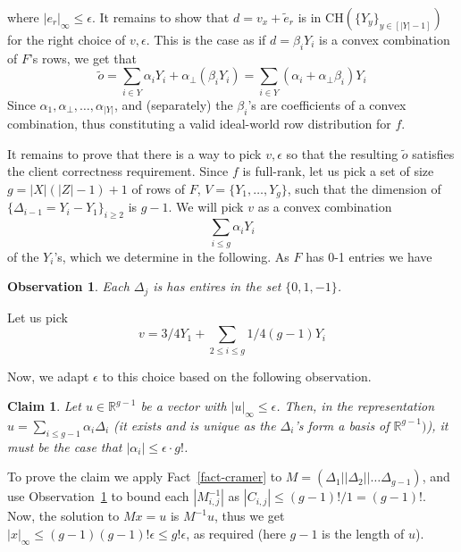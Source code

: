 \documentclass[a4paper]{article}
\newtheorem{claim}[theorem]{Claim}
\newtheorem{observation}{Observation}
\newcommand{\R}{\mathbb{R}}
\newcommand{\CH}[1]{\text{CH}(#1)}
\begin{document}
where $|e_r|_\infty\leq \epsilon$.
It remains to show that $d = v_x + \tilde{e}_r$ is in $\CH{\{Y_y\}_{y\in [|Y|-1]}}$ for the right choice of $v,\epsilon$. This is the case as if $d = \beta_i Y_i$ is a convex combination of $F$'s rows, we get that
\[\tilde{o} = \sum_{i\in Y}\alpha_i Y_i + \alpha_\bot (\beta_i Y_i)=\sum_{i\in Y}(\alpha_i +\alpha_\bot\beta_i)Y_i\]
Since $\alpha_1,\alpha_\bot,\ldots,\alpha_{|Y|}$, and (separately) the $\beta_i$'s are coefficients of a convex combination, thus constituting a valid ideal-world row distribution for $f$.


It remains to prove that there is a way to pick $v,\epsilon$ 
so that the resulting $\tilde{o}$ satisfies the client correctness requirement.
Since $f$ is full-rank, let us pick  a set of size $g=|X|(|Z|-1)+1$ of rows of $F$, $V = \{Y_1,\ldots,Y_g\}$, such that the dimension of $\{\Delta_{i-1} = Y_i - Y_1\}_{i\geq 2}$ is $g-1$. We will pick $v$ as a convex combination
\[\sum_{i\leq g}\alpha_iY_i\]
of the $Y_i$'s, which we determine in the following.
As $F$ has 0-1 entries we have 
\begin{observation}\label{obs-1}
Each $\Delta_j$ is has entires in the set $\{0,1,-1\}$.
\end{observation}
Let us pick
\[v = 3/4Y_1 + \sum_{2\leq i\leq g}1/4(g-1) Y_i\]

Now, we adapt $\epsilon$ to this choice based on the following observation.
\begin{claim}\label{clm-proj}
Let $u\in \R^{g-1}$ be a vector with $|u|_\infty \leq \epsilon$. 
Then, in the representation $u = \sum_{i\leq g-1}\alpha_i\Delta_i$
(it exists and is unique as the $\Delta_i$'s form a basis of $\R^{g-1})$),
it must be the case that $|\alpha_i|\leq \epsilon \cdot g!$.  
\end{claim}

To prove the claim we apply Fact~\ref{fact-cramer} to $M=(\Delta_1||\Delta_2||\ldots \Delta_{g-1})$, and use Observation~\ref{obs-1} to bound each $|{M}^{-1}_{i,j}|$ as $|C_{i,j}|\leq (g-1)!/1=(g-1)!$. Now, the solution to $Mx=u$ is $M^{-1}u$, thus we get $|x|_\infty\leq (g-1)(g-1)!\epsilon\leq g!\epsilon$, as required (here $g-1$ is the length of $u$).
\end{document}
